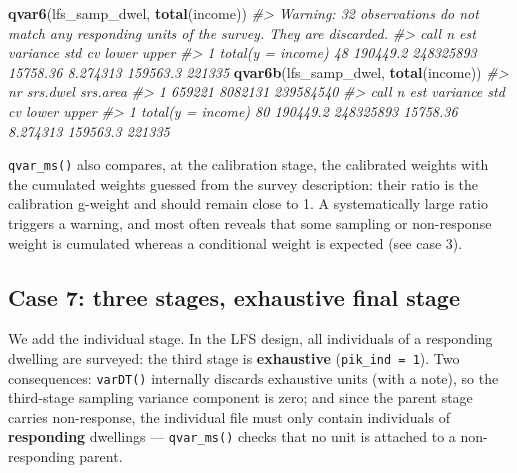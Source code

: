 \documentclass[
]{article}
\newenvironment{Shaded}{\begin{snugshade}}{\end{snugshade}}
\newcommand{\CommentTok}[1]{\textcolor[rgb]{0.56,0.35,0.01}{\textit{#1}}}
\newcommand{\FunctionTok}[1]{\textcolor[rgb]{0.13,0.29,0.53}{\textbf{#1}}}
\newcommand{\NormalTok}[1]{#1}
\begin{document}
\begin{Shaded}
\begin{Highlighting}[]
\FunctionTok{qvar6}\NormalTok{(lfs\_samp\_dwel, }\FunctionTok{total}\NormalTok{(income))}
\CommentTok{\#\textgreater{} Warning: 32 observations do not match any responding units of the survey. They are discarded.}
\CommentTok{\#\textgreater{}                call  n      est  variance      std       cv    lower  upper}
\CommentTok{\#\textgreater{} 1 total(y = income) 48 190449.2 248325893 15758.36 8.274313 159563.3 221335}
\FunctionTok{qvar6b}\NormalTok{(lfs\_samp\_dwel, }\FunctionTok{total}\NormalTok{(income))}
\CommentTok{\#\textgreater{}       nr srs.dwel  srs.area}
\CommentTok{\#\textgreater{} 1 659221  8082131 239584540}
\CommentTok{\#\textgreater{}                call  n      est  variance      std       cv    lower  upper}
\CommentTok{\#\textgreater{} 1 total(y = income) 80 190449.2 248325893 15758.36 8.274313 159563.3 221335}
\end{Highlighting}
\end{Shaded}

\texttt{qvar\_ms()} also compares, at the calibration stage, the
calibrated weights with the cumulated weights guessed from the survey
description: their ratio is the calibration g-weight and should remain
close to 1. A systematically large ratio triggers a warning, and most
often reveals that some sampling or non-response weight is cumulated
whereas a conditional weight is expected (see case 3).

\subsection{Case 7: three stages, exhaustive final
stage}\label{case-7-three-stages-exhaustive-final-stage}

We add the individual stage. In the LFS design, all individuals of a
responding dwelling are surveyed: the third stage is \textbf{exhaustive}
(\texttt{pik\_ind\ =\ 1}). Two consequences: \texttt{varDT()} internally
discards exhaustive units (with a note), so the third-stage sampling
variance component is zero; and since the parent stage carries
non-response, the individual file must only contain individuals of
\textbf{responding} dwellings --- \texttt{qvar\_ms()} checks that no
unit is attached to a non-responding parent.
\end{document}
